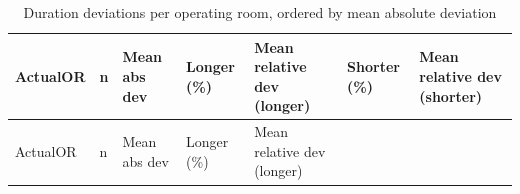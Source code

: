 \documentclass[
]{article}
\begin{document}
\begin{longtable}[]{@{}
  >{\centering\arraybackslash}p{}
  >{\centering\arraybackslash}p{}
  >{\centering\arraybackslash}p{}
  >{\centering\arraybackslash}p{}
  >{\centering\arraybackslash}p{}
  >{\centering\arraybackslash}p{}
  >{\centering\arraybackslash}p{}@{}}
\caption{Duration deviations per operating room, ordered by mean
absolute deviation \label{tab:ordeviation_or}}\tabularnewline
\toprule\noalign{}
\begin{minipage}[b]{\linewidth}\centering
ActualOR
\end{minipage} & \begin{minipage}[b]{\linewidth}\centering
n
\end{minipage} & \begin{minipage}[b]{\linewidth}\centering
Mean abs dev
\end{minipage} & \begin{minipage}[b]{\linewidth}\centering
Longer (\%)
\end{minipage} & \begin{minipage}[b]{\linewidth}\centering
Mean relative dev (longer)
\end{minipage} & \begin{minipage}[b]{\linewidth}\centering
Shorter (\%)
\end{minipage} & \begin{minipage}[b]{\linewidth}\centering
Mean relative dev (shorter)
\end{minipage} \\
\midrule\noalign{}
\endfirsthead
\toprule\noalign{}
\begin{minipage}[b]{\linewidth}\centering
ActualOR
\end{minipage} & \begin{minipage}[b]{\linewidth}\centering
n
\end{minipage} & \begin{minipage}[b]{\linewidth}\centering
Mean abs dev
\end{minipage} & \begin{minipage}[b]{\linewidth}\centering
Longer (\%)
\end{minipage} & \begin{minipage}[b]{\linewidth}\centering
Mean relative dev (longer)

\end{minipage}
\end{longtable}
\end{document}
